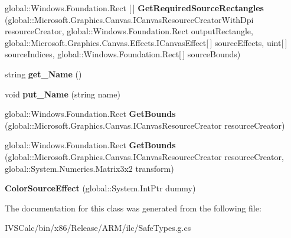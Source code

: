 \begin{DoxyCompactItemize}
\mbox{\label{class_microsoft_1_1_graphics_1_1_canvas_1_1_effects_1_1_color_source_effect_a1c43f5044395c076e8cb6d1321105f5b}} 
global\+::\+Windows.\+Foundation.\+Rect \mbox{[}$\,$\mbox{]} {\bfseries Get\+Required\+Source\+Rectangles} (global\+::\+Microsoft.\+Graphics.\+Canvas.\+I\+Canvas\+Resource\+Creator\+With\+Dpi resource\+Creator, global\+::\+Windows.\+Foundation.\+Rect output\+Rectangle, global\+::\+Microsoft.\+Graphics.\+Canvas.\+Effects.\+I\+Canvas\+Effect\mbox{[}$\,$\mbox{]} source\+Effects, uint\mbox{[}$\,$\mbox{]} source\+Indices, global\+::\+Windows.\+Foundation.\+Rect\mbox{[}$\,$\mbox{]} source\+Bounds)
\item 
\mbox{\label{class_microsoft_1_1_graphics_1_1_canvas_1_1_effects_1_1_color_source_effect_ae820773ac00c8c77c4cfbf10be511632}} 
string {\bfseries get\+\_\+\+Name} ()
\item 
\mbox{\label{class_microsoft_1_1_graphics_1_1_canvas_1_1_effects_1_1_color_source_effect_a4ee266bd0603e3d57e34054b28a846d4}} 
void {\bfseries put\+\_\+\+Name} (string name)
\item 
\mbox{\label{class_microsoft_1_1_graphics_1_1_canvas_1_1_effects_1_1_color_source_effect_af61108cb3e4a0ce6fd889a6a9d32e064}} 
global\+::\+Windows.\+Foundation.\+Rect {\bfseries Get\+Bounds} (global\+::\+Microsoft.\+Graphics.\+Canvas.\+I\+Canvas\+Resource\+Creator resource\+Creator)
\item 
\mbox{\label{class_microsoft_1_1_graphics_1_1_canvas_1_1_effects_1_1_color_source_effect_ac07673683be10bd62c31179c175fac51}} 
global\+::\+Windows.\+Foundation.\+Rect {\bfseries Get\+Bounds} (global\+::\+Microsoft.\+Graphics.\+Canvas.\+I\+Canvas\+Resource\+Creator resource\+Creator, global\+::\+System.\+Numerics.\+Matrix3x2 transform)
\item 
\mbox{\label{class_microsoft_1_1_graphics_1_1_canvas_1_1_effects_1_1_color_source_effect_adcf034615ebebebdbb68c0a0f2da93eb}} 
{\bfseries Color\+Source\+Effect} (global\+::\+System.\+Int\+Ptr dummy)
\end{DoxyCompactItemize}


The documentation for this class was generated from the following file\+:\begin{DoxyCompactItemize}
\item 
I\+V\+S\+Calc/bin/x86/\+Release/\+A\+R\+M/ilc/Safe\+Types.\+g.\+cs\end{DoxyCompactItemize}
